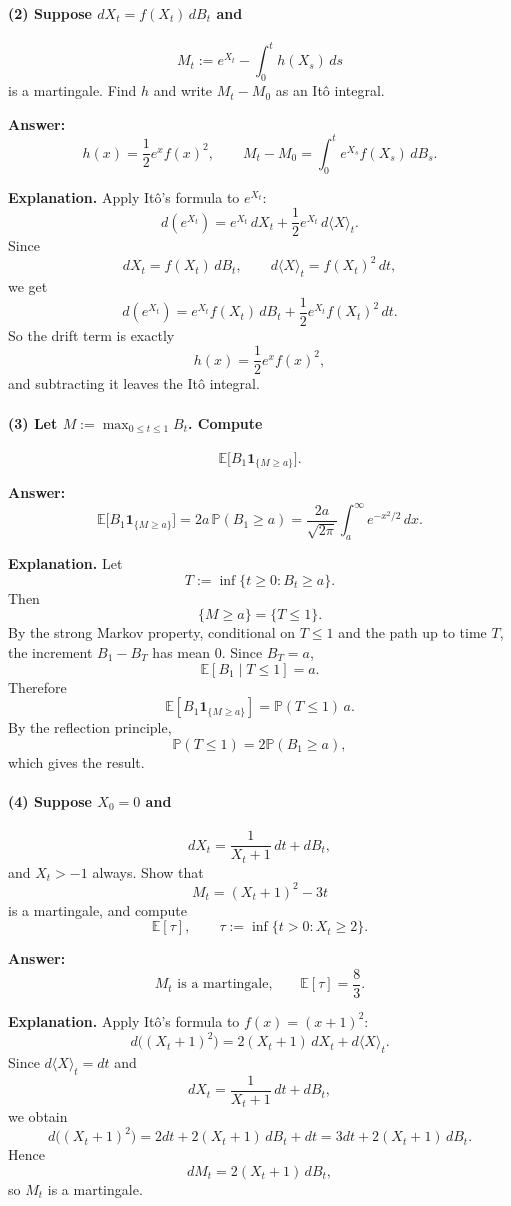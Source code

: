 \documentclass[11pt]{article}
\theoremstyle{definition}
\begin{document}
\paragraph{(2) Suppose $dX_t=f(X_t)\,dB_t$ and}
\[
M_t:=e^{X_t}-\int_0^t h(X_s)\,ds
\]
is a martingale. Find $h$ and write $M_t-M_0$ as an It\^o integral.

\textbf{Answer:}
\[
 h(x)=\frac12 e^x f(x)^2,
 \qquad
 M_t-M_0=\int_0^t e^{X_s}f(X_s)\,dB_s.
\]

\textbf{Explanation.} Apply It\^o's formula to $e^{X_t}$:
\[
 d(e^{X_t}) = e^{X_t}\,dX_t + \frac12 e^{X_t}\,d\langle X\rangle_t.
\]
Since
\[
 dX_t=f(X_t)\,dB_t,
 \qquad
 d\langle X\rangle_t=f(X_t)^2\,dt,
\]
we get
\[
 d(e^{X_t}) = e^{X_t}f(X_t)\,dB_t + \frac12 e^{X_t}f(X_t)^2\,dt.
\]
So the drift term is exactly
\[
 h(x)=\frac12 e^x f(x)^2,
\]
and subtracting it leaves the It\^o integral.

\paragraph{(3) Let $M:=\max_{0\le t\le 1} B_t$. Compute}
\[
\mathbb E\bigl[B_1\mathbf 1_{\{M\ge a\}}\bigr].
\]

\textbf{Answer:}
\[
\mathbb E\bigl[B_1\mathbf 1_{\{M\ge a\}}\bigr]
=
2a\,\mathbb P(B_1\ge a)
=
\frac{2a}{\sqrt{2\pi}}\int_a^{\infty} e^{-x^2/2}\,dx.
\]

\textbf{Explanation.} Let
\[
T:=\inf\{t\ge 0: B_t\ge a\}.
\]
Then
\[
\{M\ge a\}=\{T\le 1\}.
\]
By the strong Markov property, conditional on $T\le 1$ and the path up to time $T$, the increment $B_1-B_T$ has mean $0$. Since $B_T=a$,
\[
\mathbb E[B_1\mid T\le 1]=a.
\]
Therefore
\[
\mathbb E[B_1\mathbf 1_{\{M\ge a\}}]
=
\mathbb P(T\le 1)\,a.
\]
By the reflection principle,
\[
\mathbb P(T\le 1)=2\mathbb P(B_1\ge a),
\]
which gives the result.

\paragraph{(4) Suppose $X_0=0$ and}
\[
 dX_t=\frac{1}{X_t+1}\,dt + dB_t,
\]
and $X_t>-1$ always. Show that
\[
M_t=(X_t+1)^2-3t
\]
is a martingale, and compute
\[
\mathbb E[\tau],
\qquad
\tau:=\inf\{t>0:X_t\ge 2\}.
\]

\textbf{Answer:}
\[
M_t\text{ is a martingale,}
\qquad
\mathbb E[\tau]=\frac83.
\]

\textbf{Explanation.} Apply It\^o's formula to $f(x)=(x+1)^2$:
\[
 d\bigl((X_t+1)^2\bigr)=2(X_t+1)\,dX_t + d\langle X\rangle_t.
\]
Since $d\langle X\rangle_t=dt$ and
\[
 dX_t=\frac{1}{X_t+1}\,dt+dB_t,
\]
we obtain
\[
 d\bigl((X_t+1)^2\bigr)=2dt + 2(X_t+1)\,dB_t + dt = 3dt + 2(X_t+1)\,dB_t.
\]
Hence
\[
 dM_t = 2(X_t+1)\,dB_t,
\]
so $M_t$ is a martingale.
\end{document}
